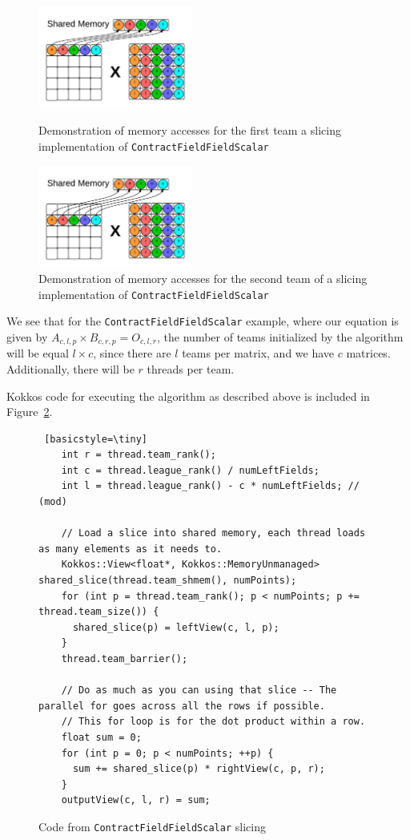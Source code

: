 \begin{figure}[H]
    \centering
    \includegraphics[width=2in]{ContractFieldFieldScalarGraphic}
    \caption[Memory accesses -- slicing]{Demonstration of memory accesses for the first team a slicing
        implementation of \texttt{ContractFieldFieldScalar}}
    \label{fig:Slicing}

    \includegraphics[width=2in]{ContractFieldFieldScalarGraphic2}
    \caption[Memory accesses -- slicing]{Demonstration of memory accesses for
    the second team of a slicing implementation of
    \texttt{ContractFieldFieldScalar}}
    \label{fig:Slicing2}
\end{figure}

We see that for the \texttt{ContractFieldFieldScalar} example, where our equation is given by
$A_{c,l,p} \times B_{c, r, p} = O_{c,l, r}$, the
number of teams initialized by the algorithm will be equal $l \times c$,
since there are $l$ teams per matrix, and we have $c$ matrices.
Additionally, there will be $r$ threads per team. 


    Kokkos code for executing the algorithm as described above is included in Figure~\ref{lst:ContractFieldFieldScalarSlice}. 

\begin{figure}[ht]
    \begin{lstlisting} [basicstyle=\tiny]
    int r = thread.team_rank();
    int c = thread.league_rank() / numLeftFields;
    int l = thread.league_rank() - c * numLeftFields; // (mod)

    // Load a slice into shared memory, each thread loads as many elements as it needs to.
    Kokkos::View<float*, Kokkos::MemoryUnmanaged> shared_slice(thread.team_shmem(), numPoints);
    for (int p = thread.team_rank(); p < numPoints; p += thread.team_size()) {
      shared_slice(p) = leftView(c, l, p);
    }
    thread.team_barrier();

    // Do as much as you can using that slice -- The parallel for goes across all the rows if possible.
    // This for loop is for the dot product within a row.
    float sum = 0;
    for (int p = 0; p < numPoints; ++p) {
      sum += shared_slice(p) * rightView(c, p, r);
    }
    outputView(c, l, r) = sum;

   \end{lstlisting}
\caption{Code from \texttt{ContractFieldFieldScalar} slicing
\label{lst:ContractFieldFieldScalarSlice}} 
\end{figure}

